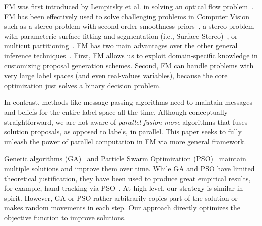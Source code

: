 \noindent FM was first introduced by Lempitsky et al. in solving an
optical flow problem~\cite{first_fusion_viktor}. FM has been effectively
used to solve challenging problems in Computer Vision such as a stereo
problem with second order smoothness priors~\cite{woodford}, a stereo
problem with parameteric surface fitting and segmentation (i.e., Surface
Stereo)~\cite{surface_stereo}, or multicut
partitioning~\cite{fusionmovesforcorrelationclustering}.
%
FM has two main advantages over the other general inference
techniques~\cite{trw,loopy_belief_propagation}. First, FM allows us to
exploit domain-specific knowledge in customizing proposal generation
schemes. Second, FM can handle problems with very large label spaces
(and even real-values variables), because the core optimization just
solves a binary decision problem.



In contrast, methods like message passing algorithms need to maintain
messages and beliefs for the entire label space all the time.
%
Although conceptually straightforward, we are not aware of {\it parallel
fusion move} algorithms that fuses solution proposals, as opposed to
labels, in parallel. This paper seeks to fully unleash the power of
parallel computation in FM via more general framework.



\noindent
Genetic algorithms (GA)~\cite{ga} and Particle Swarm
Optimization (PSO)~\cite{pso} maintain multiple solutions and improve
them over time.
%
While GA and PSO have limited theoretical justification, they have been
used to produce great empirical results, for example, hand tracking via
PSO~\cite{pushmeet_hand_tracking}. At high level, our strategy is
similar in spirit. However, GA or PSO rather arbitrarily copies part of
the solution or makes random movements in each step. Our approach
directly optimizes the objective function to improve solutions.


